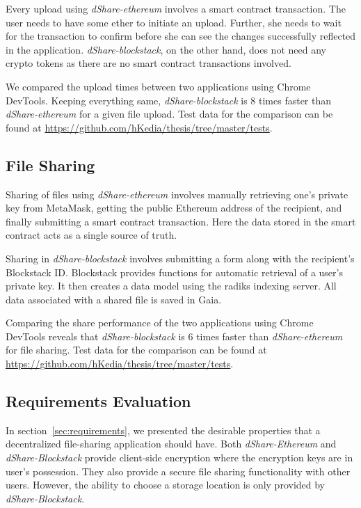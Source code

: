 		Every upload using \textit{dShare-ethereum} involves a smart contract transaction. The user needs to have some ether to initiate an upload. Further, she needs to wait for the transaction to confirm before she can see the changes successfully reflected in the application. \textit{dShare-blockstack}, on the other hand, does not need any crypto tokens as there are no smart contract transactions involved.
		
		We compared the upload times between two applications using Chrome DevTools\cite{dev:chrome:perf:2}. Keeping everything same, \textit{dShare-blockstack} is 8 times faster than \textit{dShare-ethereum} for a given file upload. Test data for the comparison can be found at \url{https://github.com/hKedia/thesis/tree/master/tests}.
		
		\subsection{File Sharing}
			Sharing of files using \textit{dShare-ethereum} involves manually retrieving one's private key from MetaMask, getting the public Ethereum address of the recipient, and finally submitting a smart contract transaction. Here the data stored in the smart contract acts as a single source of truth.
			
			Sharing in \textit{dShare-blockstack} involves submitting a form along with the recipient's Blockstack ID. Blockstack provides functions for automatic retrieval of a user's private key. It then creates a data model using the radiks indexing server. All data associated with a shared file is saved in Gaia.
			
			Comparing the share performance of the two applications using Chrome DevTools reveals that \textit{dShare-blockstack} is 6 times faster than \textit{dShare-ethereum} for file sharing. Test data for the comparison can be found at \url{https://github.com/hKedia/thesis/tree/master/tests}.
			
		\subsection{Requirements Evaluation}
			In section~\ref{sec:requirements}, we presented the desirable properties that a decentralized file-sharing application should have. Both \textit{dShare-Ethereum} and \textit{dShare-Blockstack} provide client-side encryption where the encryption keys are in user's possession. They also provide a secure file sharing functionality with other users. However, the ability to choose a storage location is only provided by \textit{dShare-Blockstack}.
			
